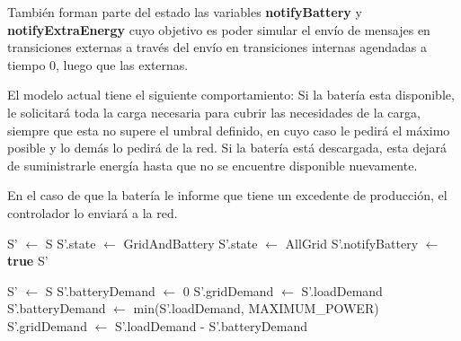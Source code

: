 También forman parte del estado las variables \textbf{notifyBattery} y \textbf{notifyExtraEnergy}
cuyo objetivo es poder simular el envío de mensajes en transiciones externas a través del envío
en transiciones internas agendadas a tiempo 0, luego que las externas.

El modelo actual tiene el siguiente comportamiento: Si la batería esta disponible, le solicitará
toda la carga necesaria para cubrir las necesidades de la carga, siempre que esta no supere
el umbral definido, en cuyo caso le pedirá el máximo posible y lo demás lo pedirá de la red.
Si la batería está descargada, esta dejará de suministrarle energía hasta que no se encuentre
disponible nuevamente.

En el caso de que la batería le informe que tiene un excedente de producción, el controlador
lo enviará a la red.


\begin{algorithm}
    \caption{$updateControllerState(S)$}
    \begin{algorithmic}[H]
        \STATE S' $\leftarrow$ S
            \STATE S'.state $\leftarrow$ GridAndBattery
            \STATE S'.state $\leftarrow$ AllGrid
            \STATE S'.notifyBattery $\leftarrow$ \textbf{true}
        \ENDIF
        \RETURN S'
    \end{algorithmic}
\end{algorithm}

\begin{algorithm}
    \caption{$updateGridConsuption(S)$}
    \begin{algorithmic}[H]
        \STATE S' $\leftarrow$ S
            \STATE S'.batteryDemand $\leftarrow$ 0
            \STATE S'.gridDemand $\leftarrow$ S'.loadDemand
        \ELSE
            \STATE S'.batteryDemand $\leftarrow$ min(S'.loadDemand, MAXIMUM\_POWER)
            \STATE S'.gridDemand $\leftarrow$ S'.loadDemand - S'.batteryDemand
        \ENDIF
    \end{algorithmic}
\end{algorithm}

